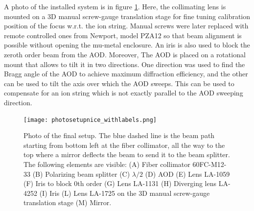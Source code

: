 A photo of the installed system is in figure \ref{photosetup}. Here, the collimating lens is mounted on a 3D manual screw-gauge translation stage for fine tuning calibration position of the focus w.r.t. the ion string. Manual screws were later replaced with remote controlled ones from Newport, model PZA12 so that beam alignment is possible without opening the mu-metal enclosure. An iris is also used to block the zeroth order beam from the AOD. Moreover, The AOD is placed on a rotational mount that allows to tilt it in two directions. One direction was used to find the Bragg angle of the AOD to achieve maximum diffraction efficiency, and the other can be used to tilt the axis over which the AOD sweeps. This can be used to compensate for an ion string which is not exactly parallel to the AOD sweeping direction.

\begin{figure}[H]
\centering
\texttt{[image: photosetupnice\_withlabels.png]}
\caption{Photo of the final setup. The blue dashed line is the beam path starting from bottom left at the fiber collimator, all the way to the top where a mirror deflects the beam to send it to the beam splitter. The following elements are visible: (A) Fiber collimator 60FC-M12-33 (B) Polarizing beam splitter (C) $\lambda/2$ (D) AOD (E) Lens LA-1059 (F) Iris to block 0th order (G) Lens LA-1131 (H) Diverging lens LA-4252 (I) Iris (L) Lens LA-1725 on the 3D manual screw-gauge translation stage (M) Mirror. }
\label{photosetup}
\end{figure}
